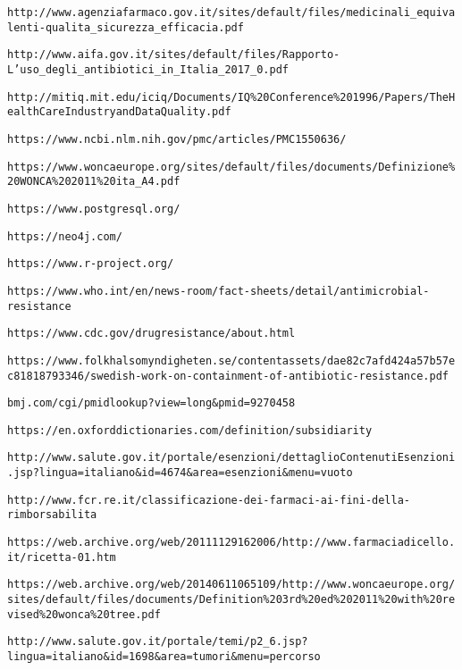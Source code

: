 \begin{thebibliography}{}
	\texttt{http://www.agenziafarmaco.gov.it/sites/default/files/medicinali\_equivalenti-qualita\_sicurezza\_efficacia.pdf}
	
	\texttt{http://www.aifa.gov.it/sites/default/files/Rapporto-L'uso\_degli\_antibiotici\_in\_Italia\_2017\_0.pdf}
	
	\texttt{http://mitiq.mit.edu/iciq/Documents/IQ\%20Conference\%201996/Papers/TheHealthCareIndustryandDataQuality.pdf}
	
	\texttt{https://www.ncbi.nlm.nih.gov/pmc/articles/PMC1550636/}
	
	\texttt{https://www.woncaeurope.org/sites/default/files/documents/Definizione\%20WONCA\%202011\%20ita\_A4.pdf}
	
	\texttt{https://www.postgresql.org/}
	
	\texttt{https://neo4j.com/}
	
	\texttt{https://www.r-project.org/}
	
	\texttt{https://www.who.int/en/news-room/fact-sheets/detail/antimicrobial-resistance}
	
	\texttt{https://www.cdc.gov/drugresistance/about.html}
	
	\texttt{https://www.folkhalsomyndigheten.se/contentassets/dae82c7afd424a57b57ec81818793346/swedish-work-on-containment-of-antibiotic-resistance.pdf}
	
	\texttt{bmj.com/cgi/pmidlookup?view=long\&pmid=9270458}
	
	\texttt{https://en.oxforddictionaries.com/definition/subsidiarity}
	
	\texttt{http://www.salute.gov.it/portale/esenzioni/dettaglioContenutiEsenzioni.jsp?lingua=italiano\&id=4674\&area=esenzioni\&menu=vuoto}
	
	\texttt{http://www.fcr.re.it/classificazione-dei-farmaci-ai-fini-della-rimborsabilita}
	
	\texttt{https://web.archive.org/web/20111129162006/http://www.farmaciadicello.it/ricetta-01.htm}
	
	\texttt{https://web.archive.org/web/20140611065109/http://www.woncaeurope.org/sites/default/files/documents/Definition\%203rd\%20ed\%202011\%20with\%20revised\%20wonca\%20tree.pdf}
	
	\texttt{http://www.salute.gov.it/portale/temi/p2\_6.jsp?lingua=italiano\&id=1698\&area=tumori\&menu=percorso}
	

\end{thebibliography}
